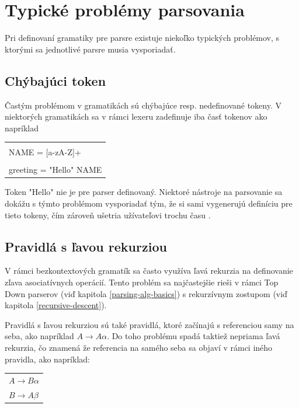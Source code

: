 \section{Typické problémy parsovania}
Pri definovaní gramatiky pre parsre existuje niekoľko typických problémov, s ktorými sa jednotlivé parsre musia vysporiadať. 

\subsection{Chýbajúci token}
Častým problémom v gramatikách sú chýbajúce resp. nedefinované tokeny. V niektorých gramatikách sa v rámci lexeru zadefinuje iba časť tokenov ako napríklad

\begin{center}
\begin{tabular}{p{}}
\color{editorGray}{/* Lexer */}\\
NAME = [a-zA-Z]+\\
\color{editorGray}{/* Parser */}\\
greeting = "Hello"{ NAME}
\end{tabular}
\end{center}

Token "Hello"{ }nie je pre parser definovaný. Niektoré nástroje na parsovanie sa dokážu s týmto problémom vysporiadať tým, že si sami vygenerujú definíciu pre tieto tokeny, čím zároveň ušetria užívateľovi trochu času \cite{tomassetti:parsing}.

\subsection{Pravidlá s ľavou rekurziou}\label{left-recursion-rule}
V rámci bezkontextových gramatík sa často využíva ľavá rekurzia na definovanie zľava asociatívnych operácií. Tento problém sa najčastejšie rieši v rámci Top Down parserov (viď kapitola \ref{parsing-alg-basics}) s rekurzívnym zostupom (viď kapitola \ref{recursive-descent}). 

Pravidlá s ľavou rekurziou sú také pravidlá, ktoré začínajú s referenciou samy na seba, ako napríklad $A \rightarrow A\alpha$. Do toho problému spadá taktiež nepriama ľavá rekurzia, čo znamená že referencia na samého seba sa objaví v rámci iného pravidla, ako napríklad:

\begin{center}
\begin{tabular}{p{}}
$A \rightarrow B\alpha$\\
$B \rightarrow A\beta$\\
\end{tabular}
\end{center}

